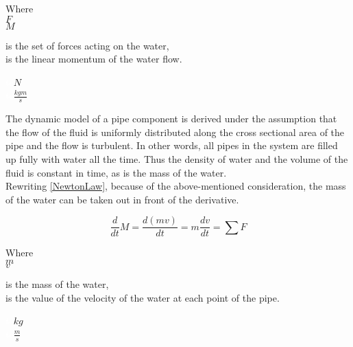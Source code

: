 \begin{minipage}[t]{0.20\textwidth}
Where\\
\hspace*{8mm} $F$ \\
\hspace*{8mm} $M$ 
\end{minipage}
\begin{minipage}[t]{0.68\textwidth}
\vspace*{2mm}
is the set of forces acting on the water,\\
is the linear momentum of the water flow.

\end{minipage}
\begin{minipage}[t]{0.10\textwidth}
\vspace*{2mm}
\textcolor{White}{te}$\unit{N}$\\
\textcolor{White}{te}$\unit{\frac{kgm}{s}}$
\end{minipage}

The dynamic model of a pipe component is derived under the assumption that the flow of the fluid is uniformly distributed along the cross sectional area of the pipe and the flow is turbulent. In other words, all pipes in the system are filled up fully with water all the time. Thus the density of water and the volume of the fluid is constant in time, as is the mass of the water.
\\
Rewriting \eqref{NewtonLaw}, because of the above-mentioned consideration, the mass of the water can be taken out in front of the derivative.

\begin{equation}
  \frac{d}{dt} M = {\frac{d(m v)}{dt}} = m \frac{dv}{dt} = \sum F
\end{equation} 

\begin{minipage}[t]{0.20\textwidth}
Where\\
\hspace*{8mm} $m$ \\
\hspace*{8mm} $v$ 
\end{minipage}
\begin{minipage}[t]{0.68\textwidth}
\vspace*{2mm}
is the mass of the water,\\
is the value of the velocity of the water at each point of the pipe.

\end{minipage}
\begin{minipage}[t]{0.10\textwidth}
\vspace*{2mm}
\textcolor{White}{te}$\unit{kg}$\\
\textcolor{White}{te}$\unit{\frac{m}{s}}$
\end{minipage}

